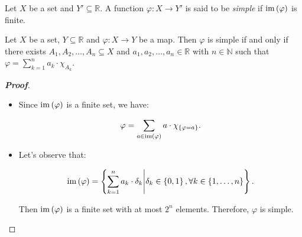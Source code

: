 \begin{definition}
  Let $X$ be a set and $Y'\subseteq\mathbb{R}$. A function $\varphi:X\rightarrow Y'$ is said to be \emph{simple} if $\operatorname{im}\left(\varphi\right)$ is finite.
\end{definition}

\begin{proposition}
  Let $X$ be a set, $Y\subseteq\mathbb{R}$ and $\varphi:X\rightarrow Y$ be a map. Then $\varphi$ is simple if and only if there exists $A_1,A_2,\dots,A_n\subseteq X$ and $a_1,a_2,\dots,a_n\in\mathbb{R}$ with $n\in\mathbb{N}$ such that $\varphi=\sum_{k=1}^{n}{a_k\cdot\chi_{A_k}}$.
  \begin{proof}[\rm\textbf{Proof}]
    \hfill
    \begin{itemize}
      \item[\boxed{\Rightarrow}] Since $\operatorname{im}\left(\varphi\right)$ is a finite set, we have:
      
      \begin{equation}
        \varphi=\sum_{a\in\operatorname{im}\left(\varphi\right)}{a\cdot\chi_{\left\{\varphi=a\right\}}}.
      \end{equation}
      \item[\boxed{\Leftarrow}] Let's observe that:

      \begin{equation}
        \operatorname{im}\left(\varphi\right)=\left\{\sum_{k=1}^{n}{a_k\cdot\delta_k}\middle|\delta_k\in\left\{0,1\right\},\forall k\in\left\{1,\dots, n\right\}\right\}.
      \end{equation}

      Then $\operatorname{im}\left(\varphi\right)$ is a finite set with at most $2^n$ elements. Therefore, $\varphi$ is simple.
    \end{itemize}
  \end{proof}
\end{proposition}

